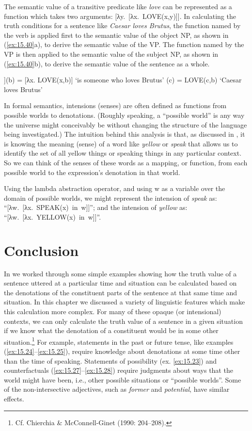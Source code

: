 The semantic value of a transitive predicate like \textit{love} can be represented as a function which takes two arguments: [λy.~[λx.~LOVE(x,y)]]. In calculating the truth conditions for a sentence like \textit{Caesar loves Brutus}, the function named by the verb is applied first to the semantic value of the object NP, as shown in (\ref{ex:15.40}a), to derive the semantic value of the VP. The function named by the VP is then applied to the semantic value of the subject NP, as shown in (\ref{ex:15.40}b), to derive the semantic value of the sentence as a whole.


\ea \label{ex:15.40}
\ea  [λy. [λx. LOVE(x,y)]](b) = [λx. LOVE(x,b)] ‘is someone who loves Brutus’
\ex  [λx. LOVE(x,b)](c) =  LOVE(c,b) ‘Caesar loves Brutus’
\z \z


In formal semantics, intensions (senses) are often defined as functions from possible worlds to denotations. (Roughly speaking, a “possible world” is any way the universe might conceivably be without changing the structure of the language being investigated.) The intuition behind this analysis is that, as discussed in , it is knowing the meaning (sense) of a word like \textit{yellow} or \textit{speak} that allows us to identify the set of all yellow things or speaking things in any particular context. So we can think of the senses of these words as a mapping, or function, from each possible world to the expression’s denotation in that world.



Using the lambda abstraction operator, and using w as a variable over the domain of possible worlds, we might represent the intension of \textit{speak} as: “[λw.~[λx.~SPEAK(x)~in~w]]”; and the intension of \textit{yellow} as: “[λw.~[λx.~YELLOW(x)~in~w]]”.


\section{Conclusion}\label{sec:15.7}

In  we worked through some simple examples showing how the truth value of a sentence uttered at a particular time and situation can be calculated based on the denotations of the constituent parts of the sentence at that same time and situation. In this chapter we discussed a variety of linguistic features which make this calculation more complex. For many of these opaque (or intensional) contexts, we can only calculate the truth value of a sentence in a given situation if we know what the denotation of a constituent would be in some other situation.\footnote{Cf. Chierchia \& McConnell-Ginet (1990: 204–208).} For example, statements in the past or future tense, like examples (\ref{ex:15.24}--\ref{ex:15.25}), require knowledge about denotations at some time other than the time of speaking. Statements of possibility (ex. \ref{ex:15.23}) and counterfactuals (\ref{ex:15.27}--\ref{ex:15.28}) require judgments about ways that the world might have been, i.e., other possible situations or “possible worlds”. Some of the non-intersective adjectives, such as \textit{former} and \textit{potential}, have similar effects.



